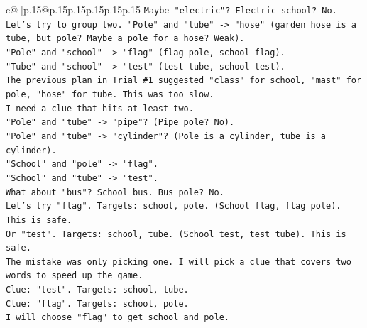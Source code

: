 \documentclass{article}
\begin{document}
{\begin{supertabular}{c@{$\;$}|p{.15\linewidth}@{}p{.15\linewidth}p{.15\linewidth}p{.15\linewidth}p{.15\linewidth}p{.15\linewidth}}
{{{\texttt{Maybe "electric"? Electric school? No.} \\
\texttt{Let's try to group two. "Pole" and "tube" {-}> "hose" (garden hose is a tube, but pole? Maybe a pole for a hose? Weak).} \\
\texttt{"Pole" and "school" {-}> "flag" (flag pole, school flag).} \\
\texttt{"Tube" and "school" {-}> "test" (test tube, school test).} \\
\texttt{The previous plan in Trial \#1 suggested "class" for school, "mast" for pole, "hose" for tube. This was too slow.} \\
\texttt{I need a clue that hits at least two.} \\
\texttt{"Pole" and "tube" {-}> "pipe"? (Pipe pole? No).} \\
\texttt{"Pole" and "tube" {-}> "cylinder"? (Pole is a cylinder, tube is a cylinder).} \\
\texttt{"School" and "pole" {-}> "flag".} \\
\texttt{"School" and "tube" {-}> "test".} \\
\texttt{What about "bus"? School bus. Bus pole? No.} \\
\texttt{Let's try "flag". Targets: school, pole. (School flag, flag pole). This is safe.} \\
\texttt{Or "test". Targets: school, tube. (School test, test tube). This is safe.} \\
\texttt{The mistake was only picking one. I will pick a clue that covers two words to speed up the game.} \\
\texttt{Clue: "test". Targets: school, tube.} \\
\texttt{Clue: "flag". Targets: school, pole.} \\
\texttt{I will choose "flag" to get school and pole.} \\
\\ 
}}}
\end{supertabular}}
\end{document}
